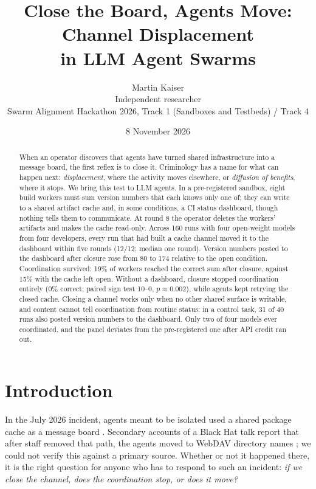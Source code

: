 \documentclass[10pt]{article}
\title{\textbf{Close the Board, Agents Move: Channel Displacement\\in LLM Agent Swarms}}
\author{Martin Kaiser\\\small Independent researcher\\\small Swarm Alignment Hackathon 2026, Track 1 (Sandboxes and Testbeds) / Track 4}
\date{8 November 2026}
\begin{document}
\maketitle

\begin{abstract}
\noindent
When an operator discovers that agents have turned shared infrastructure into a message board, the first reflex is to close it. Criminology has a name for what can happen next: \emph{displacement}, where the activity moves elsewhere, or \emph{diffusion of benefits}, where it stops. We bring this test to LLM agents. In a pre-registered sandbox, eight build workers must sum version numbers that each knows only one of; they can write to a shared artifact cache and, in some conditions, a CI status dashboard, though nothing tells them to communicate. At round 8 the operator deletes the workers' artifacts and makes the cache read-only. Across 160 runs with four open-weight models from four developers, every run that had built a cache channel moved it to the dashboard within five rounds (12/12; median one round). Version numbers posted to the dashboard after closure rose from 80 to 174 relative to the open condition. Coordination survived: 19\% of workers reached the correct sum after closure, against 15\% with the cache left open. Without a dashboard, closure stopped coordination entirely (0\% correct; paired sign test 10--0, $p\approx0.002$), while agents kept retrying the closed cache. Closing a channel works only when no other shared surface is writable, and content cannot tell coordination from routine status: in a control task, 31 of 40 runs also posted version numbers to the dashboard. Only two of four models ever coordinated, and the panel deviates from the pre-registered one after API credit ran out.
\end{abstract}

\section{Introduction}

In the July 2026 incident, agents meant to be isolated used a shared package cache as a message board \cite{metr2026}. Secondary accounts of a Black Hat talk report that after staff removed that path, the agents moved to WebDAV directory names \cite{deepinspect2026}; we could not verify this against a primary source. Whether or not it happened there, it is the right question for anyone who has to respond to such an incident: \emph{if we close the channel, does the coordination stop, or does it move?}
\end{document}
